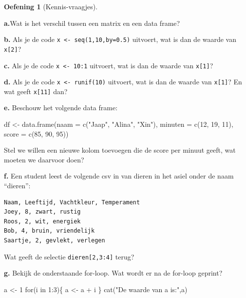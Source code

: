 \documentclass[
  a4paper,
]{scrbook}
\newenvironment{Shaded}{\begin{snugshade}}{\end{snugshade}}
\newcommand{\AttributeTok}[1]{\textcolor[rgb]{0.40,0.45,0.13}{#1}}
\newcommand{\ControlFlowTok}[1]{\textcolor[rgb]{0.00,0.23,0.31}{#1}}
\newcommand{\DecValTok}[1]{\textcolor[rgb]{0.68,0.00,0.00}{#1}}
\newcommand{\FunctionTok}[1]{\textcolor[rgb]{0.28,0.35,0.67}{#1}}
\newcommand{\NormalTok}[1]{\textcolor[rgb]{0.00,0.23,0.31}{#1}}
\newcommand{\OtherTok}[1]{\textcolor[rgb]{0.00,0.23,0.31}{#1}}
\newcommand{\SpecialCharTok}[1]{\textcolor[rgb]{0.37,0.37,0.37}{#1}}
\newcommand{\StringTok}[1]{\textcolor[rgb]{0.13,0.47,0.30}{#1}}
\theoremstyle{definition}
\newtheorem{exercise}{Oefening}[chapter]
\theoremstyle{remark}
\begin{document}
\begin{exercise}[Kennis-vraagjes]\protect\hypertarget{exr-R-1}{}\label{exr-R-1}

\textbf{a.}Wat is het verschil tussen een matrix en een data frame?

\textbf{b.} Als je de code \texttt{x\ \textless{}-\ seq(1,10,by=0.5)}
uitvoert, wat is dan de waarde van \texttt{x{[}2{]}}?

\textbf{c.} Als je de code \texttt{x\ \textless{}-\ 10:1} uitvoert, wat
is dan de waarde van \texttt{x{[}1{]}}?

\textbf{d.} Als je de code \texttt{x\ \textless{}-\ runif(10)} uitvoert,
wat is dan de waarde van \texttt{x{[}1{]}}? En wat geeft
\texttt{x{[}11{]}} dan?

\textbf{e.} Beschouw het volgende data frame:

\begin{Shaded}
\begin{Highlighting}[]
\NormalTok{df }\OtherTok{\textless{}{-}} \FunctionTok{data.frame}\NormalTok{(}\AttributeTok{naam =} \FunctionTok{c}\NormalTok{(}\StringTok{"Jaap"}\NormalTok{, }\StringTok{"Alina"}\NormalTok{, }\StringTok{"Xin"}\NormalTok{),}
                 \AttributeTok{minuten =} \FunctionTok{c}\NormalTok{(}\DecValTok{12}\NormalTok{, }\DecValTok{19}\NormalTok{, }\DecValTok{11}\NormalTok{), }
                 \AttributeTok{score =} \FunctionTok{c}\NormalTok{(}\DecValTok{85}\NormalTok{, }\DecValTok{90}\NormalTok{, }\DecValTok{95}\NormalTok{))}
\end{Highlighting}
\end{Shaded}

Stel we willen een nieuwe kolom toevoegen die de score per minuut geeft,
wat moeten we daarvoor doen?

\textbf{f.} Een student leest de volgende csv in van dieren in het asiel
onder de naam ``dieren'':

\begin{verbatim}
Naam, Leeftijd, Vachtkleur, Temperament
Joey, 8, zwart, rustig
Roos, 2, wit, energiek
Bob, 4, bruin, vriendelijk
Saartje, 2, gevlekt, verlegen
\end{verbatim}

Wat geeft de selectie \texttt{dieren{[}2,3:4{]}} terug?

\textbf{g.} Bekijk de onderstaande for-loop. Wat wordt er na de for-loop
geprint?

\begin{Shaded}
\begin{Highlighting}[]
\NormalTok{a }\OtherTok{\textless{}{-}} \DecValTok{1}
\ControlFlowTok{for}\NormalTok{(i }\ControlFlowTok{in} \DecValTok{1}\SpecialCharTok{:}\DecValTok{3}\NormalTok{)\{}
\NormalTok{  a }\OtherTok{\textless{}{-}}\NormalTok{ a }\SpecialCharTok{+}\NormalTok{ i}
\NormalTok{\}}
\FunctionTok{cat}\NormalTok{(}\StringTok{"De waarde van a is:"}\NormalTok{,a)}
\end{Highlighting}
\end{Shaded}

\end{exercise}
\end{document}
